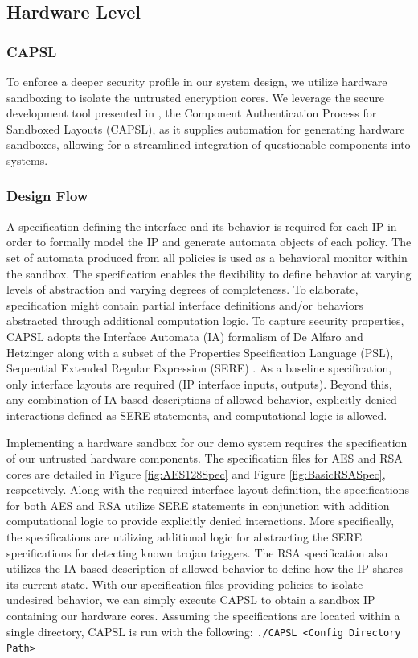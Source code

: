 \documentclass[sigconf]{acmart}
\theoremstyle{plain}
\theoremstyle{remark}
\begin{document}
\subsection{Hardware Level} \label{sec:hardware}


\subsubsection{CAPSL}

To enforce a deeper security profile in our system design, we utilize hardware sandboxing to isolate the untrusted encryption cores. We leverage the secure development tool presented in \cite{CAPSL}, the Component Authentication Process for Sandboxed Layouts (CAPSL), as it supplies automation for generating hardware sandboxes, allowing for a streamlined integration of questionable components into systems.

\subsubsection{Design Flow}

A specification defining the interface and its behavior is required for each IP in order to formally model the IP and generate automata objects of each policy. The set of automata produced from all policies is used as a behavioral monitor within the sandbox. The specification enables the flexibility to define behavior at varying levels of abstraction and varying degrees of completeness. To elaborate, specification might contain partial interface definitions and/or behaviors abstracted through additional computation logic. To capture security properties, CAPSL adopts the Interface Automata (IA) formalism of De Alfaro and Hetzinger \cite{deAlfaro} along with a subset of the Properties Specification Language (PSL), Sequential Extended Regular Expression (SERE) \cite{psl}. As a baseline specification, only interface layouts are required (IP interface inputs, outputs). Beyond this, any combination of IA-based descriptions of allowed behavior, explicitly denied interactions defined as SERE statements, and computational logic is allowed.


Implementing a hardware sandbox for our demo system requires the specification of our untrusted hardware components. The specification files for AES and RSA cores are detailed in Figure \ref{fig:AES128Spec} and Figure \ref{fig:BasicRSASpec}, respectively. Along with the required interface layout definition, the specifications for both AES and RSA utilize SERE statements in conjunction with addition computational logic to provide explicitly denied interactions. More specifically, the specifications are utilizing additional logic for abstracting the SERE specifications for detecting known trojan triggers. The RSA specification also utilizes the IA-based description of allowed behavior to define how the IP shares its current state. With our specification files providing policies to isolate undesired behavior, we can simply execute CAPSL to obtain a sandbox IP containing our hardware cores. Assuming the specifications are located within a single directory, CAPSL is run with the following:
\texttt{./CAPSL <Config Directory Path>}
\end{document}
